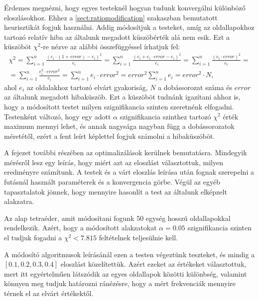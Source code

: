 \label{ch:opt}

Érdemes megnézni, hogy egyes testeknél hogyan tudunk konvergálni különböző eloszlásokhoz.
Ehhez a \ref{sect:ratiomodification} szakaszban bemutatott heurisztikát fogjuk használni.
Addig módosítjuk a testeket, amíg az oldallapokhoz tartozó relatív hiba az általunk megadott küszöbérték alá nem esik.
Ezt a küszöböt $\chi^2$-re nézve az alábbi összefüggéssel írhatjuk fel:
\[
\begin{array}{c}
\chi^2=\sum\limits_{i=1}^{n} \frac{(e_i\cdot (1+error) - e_i)^2}{e_i} = \sum\limits_{i=1}^{n} \frac{(e_i + e_i\cdot error - e_i)^2}{e_i} = \sum\limits_{i=1}^{n} \frac{(e_i\cdot error)^2}{e_i} = \\
= \sum\limits_{i=1}^{n} \frac{e_i^2\cdot error^2}{e_i} = \sum\limits_{i=1}^{n}{e_i\cdot error^2} = error^2 \sum\limits_{i=1}^{n} e_i = error^2 \cdot N,
\end{array}
\]
ahol $e_i$ az oldalakhoz tartozó elvárt gyakoriság, $N$ a dobássorozat száma és $error$ az általunk megadott hibaküszöb.
Ezt a küszöböt tudnánk igazítani ahhoz is, hogy a módosított testet milyen szignifikancia szinten szeretnénk elfogadni.
Testenként változó, hogy egy adott $\alpha$ szignifikancia szinthez tartozó  $\chi^2$ érték maximum mennyi lehet, és annak nagysága nagyban függ a dobássorozatok méretétől, ezért a fent leírt képlettel fogjuk számolni a hibaküszöböt.

A fejezet további részében az optimalizálások kerülnek bemutatásra.
Mindegyik mérésről lesz egy leírás, hogy miért azt az eloszlást választottuk, milyen eredményre számítunk.
A testek és a várt eloszlás leírása után fognak szerepelni a futásnál használt paraméterek és a konvergencia görbe.
Végül az egyéb tapasztalatok jönnek, hogy mennyire hasonlít a test az általunk elképzelt alakzatra.


Az alap tetraéder, amit módosítani fogunk 50 egység hosszú oldallapokkal rendelkezik.
Azért, hogy a módosított alakzatokat $\alpha = 0.05$ szignifikancia szinten el tudjuk fogadni a $\chi^2 < 7.815$ feltételnek teljesülnie kell.

A módosító algoritmusok leírásánál ezen a testen végeztünk teszteket, és mindig a $[0.1, 0.2, 0.3, 0.4]$ eloszlást közelítettük.
Azért ezeket az értékeket választottuk, mert itt egyértelműen látszódik az egyes oldallapok közötti különbség, valamint könnyen meg tudjuk határozni ránézésre, hogy a mért frekvenciák mennyire térnek el az elvárt értékektől.

